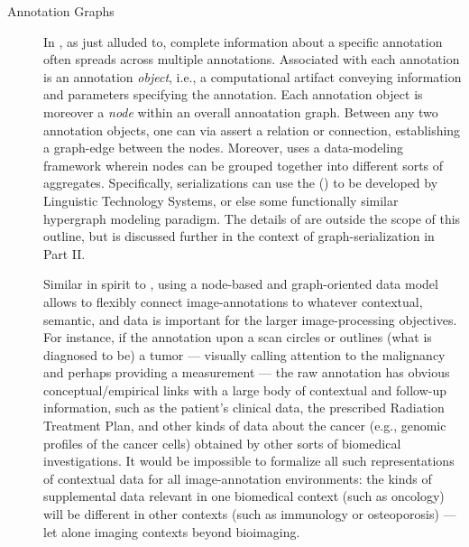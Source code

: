 {\begin{description}
\item[Annotation Graphs]  In \AXFI{}, as 
just alluded to, complete information about 
a specific annotation often spreads 
across multiple annotations.  
Associated with each annotation is an 
annotation \textit{object}, i.e., a 
computational artifact conveying information 
and parameters specifying the annotation.  
Each annotation object is moreover a \textit{node} 
within an overall annoatation graph.  Between 
any two annotation objects, one can via 
\AXFI{} assert a relation or connection, 
establishing a graph-edge between the nodes.  
Moreover, \AXFI{} uses a  
data-modeling framework wherein nodes 
can be grouped together into different sorts 
of aggregates.  Specifically, \AXFI{} 
serializations can use the  (\HGXF{}) to be developed 
by Linguistic Technology Systems, or 
else some functionally similar hypergraph 
modeling paradigm.  The details of 
\HGXF{} are outside the scope of this 
outline, but \HGXF{} is discussed further 
in the context of graph-serialization in 
Part II.  

Similar in spirit to \DICOMSR{}, using a node-based and 
graph-oriented data model allows \AXFI{} to 
flexibly connect image-annotations to 
whatever contextual, semantic, and  
data is important for the larger image-processing 
objectives.  For instance, if the annotation upon 
a \CT{} scan circles or outlines (what is 
diagnosed to be) a tumor --- visually 
calling attention to the malignancy and perhaps 
providing a measurement --- the raw annotation 
has obvious conceptual/empirical links with 
a large body of contextual and follow-up 
information, such as the patient's clinical 
data, the prescribed Radiation Treatment Plan, 
and other kinds of data about the cancer 
(e.g., genomic profiles of the cancer cells) 
obtained by other sorts of biomedical investigations.  
It would be impossible to formalize all 
such representations of contextual data for 
all image-annotation environments: the kinds 
of supplemental data relevant in one biomedical 
context (such as oncology) will be 
different in other contexts (such as 
immunology or osteoporosis) --- let alone 
imaging contexts beyond bioimaging.    
 

\end{description}}
